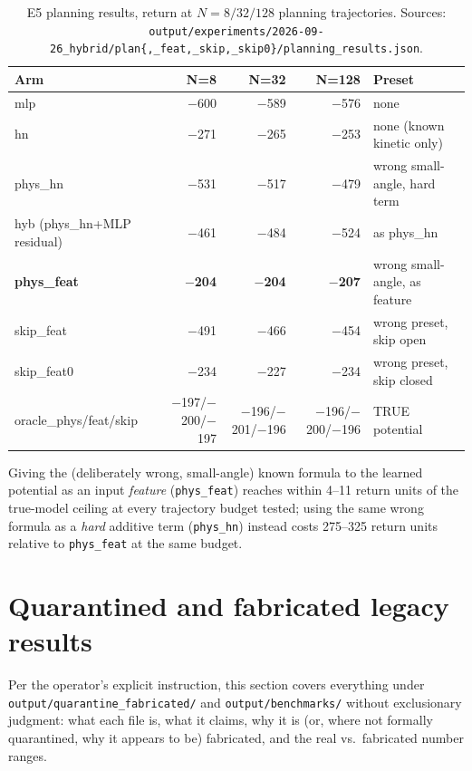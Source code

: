 \documentclass[11pt]{article}
\newcommand{\srcpath}[1]{\texttt{\small #1}}
\begin{document}
\begin{table}[h]
\centering
\small
\caption{E5 planning results, return at $N=8/32/128$ planning trajectories. Sources: \srcpath{output/experiments/2026-09-26\_hybrid/plan\{,\_feat,\_skip,\_skip0\}/planning\_results.json}.}
\begin{tabular}{lrrrl}
\toprule
Arm & N=8 & N=32 & N=128 & Preset \\
\midrule
mlp & $-$600 & $-$589 & $-$576 & none \\
hn & $-$271 & $-$265 & $-$253 & none (known kinetic only) \\
phys\_hn & $-$531 & $-$517 & $-$479 & wrong small-angle, hard term \\
hyb (phys\_hn+MLP residual) & $-$461 & $-$484 & $-$524 & as phys\_hn \\
\textbf{phys\_feat} & \textbf{$-$204} & \textbf{$-$204} & \textbf{$-$207} & wrong small-angle, as feature \\
skip\_feat & $-$491 & $-$466 & $-$454 & wrong preset, skip open \\
skip\_feat0 & $-$234 & $-$227 & $-$234 & wrong preset, skip closed \\
oracle\_phys/feat/skip & $-$197/$-$200/$-$197 & $-$196/$-$201/$-$196 & $-$196/$-$200/$-$196 & TRUE potential \\
\bottomrule
\end{tabular}
\end{table}

Giving the (deliberately wrong, small-angle) known formula to the learned potential as an input
\emph{feature} (\texttt{phys\_feat}) reaches within 4--11 return units of the true-model ceiling at
every trajectory budget tested; using the same wrong formula as a \emph{hard} additive term
(\texttt{phys\_hn}) instead costs 275--325 return units relative to \texttt{phys\_feat} at the same
budget.

\clearpage
\section{Quarantined and fabricated legacy results}
\label{sec:quarantine}
\label{sec:audit}

Per the operator's explicit instruction, this section covers everything under
\srcpath{output/quarantine\_fabricated/} and \srcpath{output/benchmarks/} without exclusionary
judgment: what each file is, what it claims, why it is (or, where not formally quarantined, why it
appears to be) fabricated, and the real vs.\ fabricated number ranges.
\end{document}

